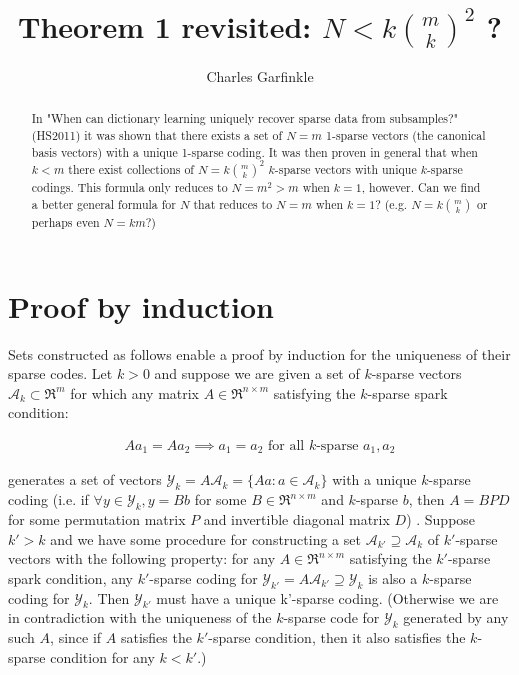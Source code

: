 \documentclass{article}
\begin{document}
\title{Theorem 1 revisited: $N < k \binom{m}{k}^2$ ?}
\author{Charles Garfinkle}

\maketitle

\begin{abstract}
In "When can dictionary learning uniquely recover sparse data from subsamples?" (HS2011) it was shown that there exists a set of $N=m$ 1-sparse vectors (the canonical basis vectors) with a unique 1-sparse coding. It was then proven in general that when $k<m$ there exist collections of $N = k \binom{m}{k}^2$ $k$-sparse vectors with unique $k$-sparse codings. This formula only reduces to $N=m^2 > m$ when $k=1$, however. Can we find a better general formula for $N$ that reduces to $N=m$ when $k=1$? (e.g. $N = k\binom{m}{k}$ or perhaps even $N=km$?)

\end{abstract}

\section{Proof by induction}

Sets constructed as follows enable a proof by induction for the uniqueness of their sparse codes. Let $k>0$ and suppose we are given a set of $k$-sparse vectors $\mathcal{A}_k \subset \Re^m$ for which any matrix $A \in \Re^{n \times m}$ satisfying the $k$-sparse spark condition:

\begin{align*}
Aa_1 = Aa_2 \implies a_1 = a_2 \text{ for all } k\text{-sparse } a_1, a_2
\end{align*}

generates a set of vectors $\mathcal{Y}_k = A\mathcal{A}_k = \{ Aa: a \in \mathcal{A}_k\}$ with a unique $k$-sparse coding (i.e. if $\forall y \in \mathcal{Y}_k, y = Bb$ for some $B \in \Re^{n \times m}$ and $k$-sparse $b$, then $A = BPD$ for some permutation matrix $P$ and invertible diagonal matrix $D$) . Suppose $k' > k$ and we have some procedure for constructing a set $\mathcal{A}_{k'} \supseteq \mathcal{A}_k$ of $k'$-sparse vectors with the following property: for any $A \in \Re^{n \times m}$ satisfying the $k'$-sparse spark condition, any $k'$-sparse coding for $\mathcal{Y}_{k'} = A\mathcal{A}_{k'} \supseteq \mathcal{Y}_k$ is also a $k$-sparse coding for $\mathcal{Y}_k$. Then $\mathcal{Y}_{k'}$ must have a unique k'-sparse coding. (Otherwise we are in contradiction with the uniqueness of the $k$-sparse code for $\mathcal{Y}_k$ generated by any such $A$, since if $A$ satisfies the $k'$-sparse condition, then it also satisfies the $k$-sparse condition for any $k < k'$.)
\end{document}
